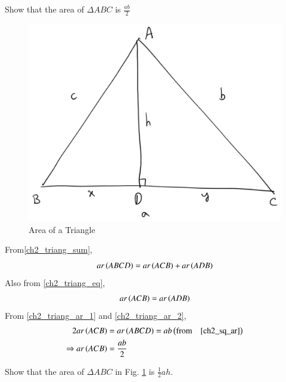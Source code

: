 \begin{problem}
	Show that the area of $\Delta ABC$ is $\frac{ab}{2}$
\end{problem}
\begin{figure}[!h]
	\begin{center}
		
		\includegraphics[width=\columnwidth]{./figs/ch2_triang_ar}
		\vspace*{-10cm}
	\end{center}
	\caption{Area of a Triangle}
	\label{ch2_triang_ar}	
\end{figure}

\proof From\eqref{ch2_triang_sum},
\begin{equation}
\label{ch2_triang_ar_1}
ar\left(ABCD\right) = ar\left(ACB\right) + ar\left(ADB\right)
\end{equation}
Also from \eqref{ch2_triang_eq},
\begin{equation}
\label{ch2_triang_ar_2}
ar\left(ACB\right) = ar\left(ADB\right)
\end{equation}
From \eqref{ch2_triang_ar_1} and \eqref{ch2_triang_ar_2},
\begin{align}
2ar\left(ACB\right) &= ar\left(ABCD\right) = ab \left(\text{from} \quad \eqref{ch2_sq_ar}\right)
\\
\Rightarrow ar\left(ACB\right) &= \frac{ab}{2}
\end{align}

\begin{problem}
	Show that the area of $\Delta ABC$ in Fig. 	\ref{ch2_triang_ar}	is $\frac{1}{2}ah$.
\end{problem}

